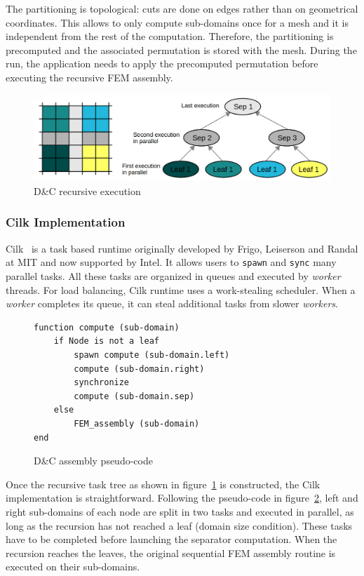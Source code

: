 \documentclass[10pt]{IOS-Book-Article}
\begin{document}
The partitioning is topological: cuts are done on edges rather than on geometrical coordinates.
This allows to only compute sub-domains once for a mesh and it is independent from the rest of the computation.
Therefore, the partitioning is precomputed and the associated permutation is stored with the mesh.
During the run, the application needs to apply the precomputed permutation before executing the recursive FEM assembly.
\begin{figure}[htp]
 \centering
 \includegraphics[scale=0.25]{DC_recursion.png}
 \caption{D\&C recursive execution}
 \label{fig:DCrec}
\end{figure}

\subsubsection{Cilk Implementation}
Cilk~\cite{cilk5} is a task based runtime originally developed by Frigo, Leiserson and Randal at MIT and now supported by Intel.
It allows users to {\tt spawn} and {\tt sync} many parallel tasks.
All these tasks are organized in queues and executed by \emph{worker} threads.
For load balancing, Cilk runtime uses a work-stealing scheduler. When a \emph{worker} completes its queue, it can steal additional tasks from slower \emph{workers}.

\begin{figure}[htp]
\small
 \begin{verbatim}
function compute (sub-domain) 
    if Node is not a leaf
        spawn compute (sub-domain.left)
        compute (sub-domain.right)
        synchronize
        compute (sub-domain.sep)
    else
        FEM_assembly (sub-domain)
end        
 \end{verbatim}
 \caption{D\&C assembly pseudo-code}
 \label{fig:DCcode}
\end{figure}

Once the recursive task tree as shown in figure~\ref{fig:DCrec} is constructed, the Cilk implementation is straightforward.
Following the pseudo-code in figure~\ref{fig:DCcode}, left and right sub-domains of each node are split in two tasks and executed in parallel, as long as the recursion has not reached a leaf (domain size condition).
These tasks have to be completed before launching the separator computation. 
When the recursion reaches the leaves, the original sequential FEM assembly routine is executed on their sub-domains.
\end{document}
